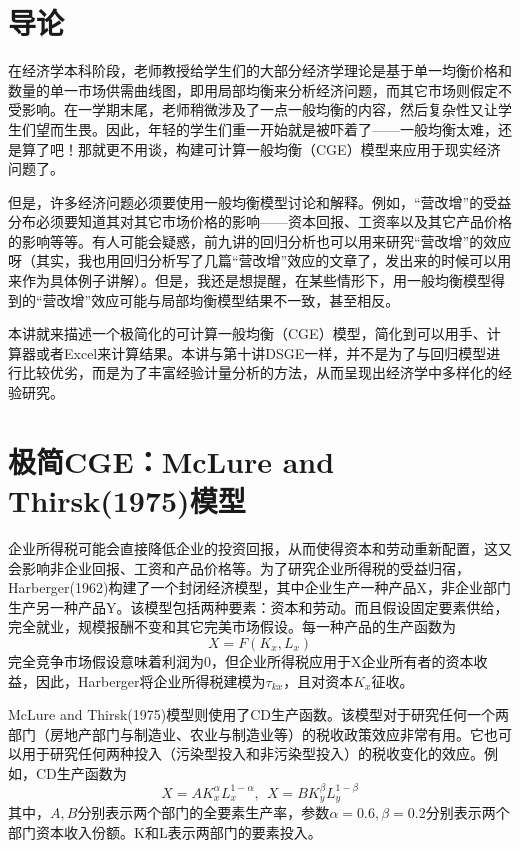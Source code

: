 \documentclass[cn,10pt,math=newtx,citestyle=gb7714-2015,bibstyle=gb7714-2015]{elegantbook}
\begin{document}
	
	\section{导论}
	在经济学本科阶段，老师教授给学生们的大部分经济学理论是基于单一均衡价格和数量的单一市场供需曲线图，即用局部均衡来分析经济问题，而其它市场则假定不受影响。在一学期末尾，老师稍微涉及了一点一般均衡的内容，然后复杂性又让学生们望而生畏。因此，年轻的学生们重一开始就是被吓着了——一般均衡太难，还是算了吧！那就更不用谈，构建可计算一般均衡（CGE）模型来应用于现实经济问题了。
	
	但是，许多经济问题必须要使用一般均衡模型讨论和解释。例如，“营改增”的受益分布必须要知道其对其它市场价格的影响——资本回报、工资率以及其它产品价格的影响等等。有人可能会疑惑，前九讲的回归分析也可以用来研究“营改增”的效应呀（其实，我也用回归分析写了几篇“营改增”效应的文章了，发出来的时候可以用来作为具体例子讲解）。但是，我还是想提醒，在某些情形下，用一般均衡模型得到的“营改增”效应可能与局部均衡模型结果不一致，甚至相反。
	
	本讲就来描述一个极简化的可计算一般均衡（CGE）模型，简化到可以用手、计算器或者Excel来计算结果。本讲与第十讲DSGE一样，并不是为了与回归模型进行比较优劣，而是为了丰富经验计量分析的方法，从而呈现出经济学中多样化的经验研究。
	
	\section{极简CGE：McLure and Thirsk(1975)模型}
	企业所得税可能会直接降低企业的投资回报，从而使得资本和劳动重新配置，这又会影响非企业回报、工资和产品价格等。为了研究企业所得税的受益归宿，Harberger(1962)构建了一个封闭经济模型，其中企业生产一种产品X，非企业部门生产另一种产品Y。该模型包括两种要素：资本和劳动。而且假设固定要素供给，完全就业，规模报酬不变和其它完美市场假设。每一种产品的生产函数为
	$$X=F(K_x,L_x)$$
	完全竞争市场假设意味着利润为0，但企业所得税应用于X企业所有者的资本收益，因此，Harberger将企业所得税建模为$\tau_{kx}$，且对资本$K_x$征收。
	
	McLure and Thirsk(1975)模型则使用了CD生产函数。该模型对于研究任何一个两部门（房地产部门与制造业、农业与制造业等）的税收政策效应非常有用。它也可以用于研究任何两种投入（污染型投入和非污染型投入）的税收变化的效应。例如，CD生产函数为
	\begin{equation}
		X=AK_x^\alpha L_x^{1-\alpha},~~X=BK_y^\beta L_y^{1-\beta}
	\end{equation}
	其中，$A,B$分别表示两个部门的全要素生产率，参数$\alpha=0.6,\beta=0.2$分别表示两个部门资本收入份额。K和L表示两部门的要素投入。
	
\end{document}
